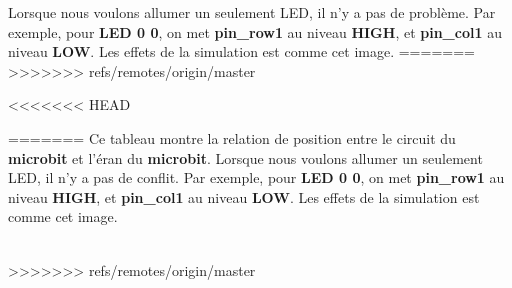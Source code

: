 \documentclass[14px]{article}
\begin{document}
Lorsque nous voulons allumer un seulement LED, il n'y a pas de problème. Par exemple, pour \textbf{LED 0 0}, on met \textbf{pin\_row1} au niveau \textbf{HIGH}, et \textbf{pin\_col1} au niveau \textbf{LOW}. Les effets de la simulation est comme cet image.
=======
>>>>>>> refs/remotes/origin/master
\begin{figure}[htbp]
\end{figure}
<<<<<<< HEAD

=======
Ce tableau montre la relation de position entre le circuit du  \textbf{microbit} et l'éran du \textbf{microbit}.
\clearpage
Lorsque nous voulons allumer un seulement LED, il n'y a pas de conflit. Par exemple, pour \textbf{LED 0 0}, on met \textbf{pin\_row1} au niveau \textbf{HIGH}, et \textbf{pin\_col1} au niveau \textbf{LOW}. Les effets de la simulation est comme cet image.\\
\begin{figure}[htbp]
\end{figure}\\
>>>>>>> refs/remotes/origin/master
\end{document}
